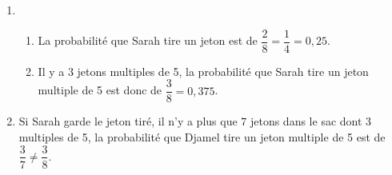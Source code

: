 
\medskip


%
%

\begin{enumerate}
\item %
	\begin{enumerate}
		\item %
La probabilité que Sarah tire un jeton  \fg{} est de $\dfrac{2}{8}
 = \dfrac{1}{4} =  0,25$.
		\item %
Il y a 3 jetons multiples de 5, la probabilité que Sarah tire un jeton multiple de 5 est
donc de $\dfrac{3}{8} = 0,375$.
	\end{enumerate}
\item  %
	
Si Sarah garde le jeton tiré, il n’y a plus que $7$ jetons dans le sac dont $3$ multiples de
5, la probabilité que Djamel tire un jeton multiple de 5 est de
$\dfrac{3}{7} \ne \dfrac{3}{8}$.
\end{enumerate}

\vspace{0,5cm}

